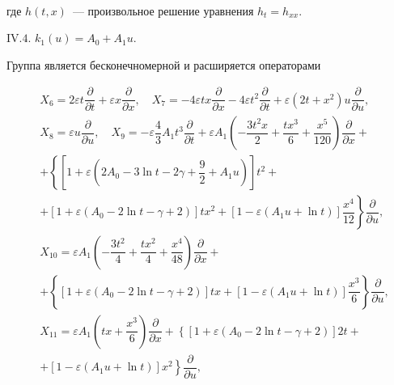 \begin{theorem}
\begin{eqnarray*}
\end{eqnarray*}

где $h(t,x)$~--- произвольное решение уравнения $h_t=h_{xx}$.



$\mathrm{IV}.4.$ $k_1(u)=A_0+A_1 u$.



Группа является бесконечномерной и расширяется операторами

\begin{eqnarray*}


& X_6=2\varepsilon t\dfrac{\partial}{\partial t}+\varepsilon x\dfrac{\partial}{\partial x}, \quad

X_7=-4\varepsilon tx\dfrac{\partial}{\partial x}-4\varepsilon t^2 \dfrac{\partial}{\partial t}+\varepsilon (2t+x^2) u \dfrac{\partial}{\partial u}, \\

& X_8=\varepsilon u\dfrac{\partial}{\partial u}, \quad

X_9=-\varepsilon \dfrac{4}{3} A_1 t^3\dfrac{\partial}{\partial t} + \varepsilon A_1 \left(-\dfrac{3t^2x}{2}+\dfrac{tx^3}{6}+\dfrac{x^5}{120} \right)\dfrac{\partial}{\partial x} + \\

& +\left\{ \left[1+\varepsilon \left(2A_0-3\ln t-2\gamma+\dfrac{9}{2}+ A_1 u\right)\right]t^2+ \right. \\

& \left. +\left[1+\varepsilon (A_0-2\ln t-\gamma+2) \right] tx^2 + [1-\varepsilon (A_1 u+\ln t)]\dfrac{x^4}{12} \right\}

\dfrac{\partial}{\partial u}, \\

& X_{10}=\varepsilon A_1 \left(-\dfrac{3t^2}{4}+\dfrac{tx^2}{4}+\dfrac{x^4}{48} \right) \dfrac{\partial}{\partial x}+\\

& +\left\{\left[1+\varepsilon(A_0-2\ln t-\gamma+2)\right]tx+ [1-\varepsilon (A_1 u +\ln t)] \dfrac{x^3}{6} \right\}\dfrac{\partial}{\partial u},\\

& X_{11}=\varepsilon A_1 \left(tx+\dfrac{x^3}{6} \right) \dfrac{\partial}{\partial x}+ 

\left\{[1+\varepsilon (A_0-2 \ln t -\gamma+2)]2t + \right. \\

& \left. +[1-\varepsilon (A_1 u + \ln t)]x^2 \right\}\dfrac{\partial}{\partial u},\\


\end{eqnarray*}
\end{theorem}
